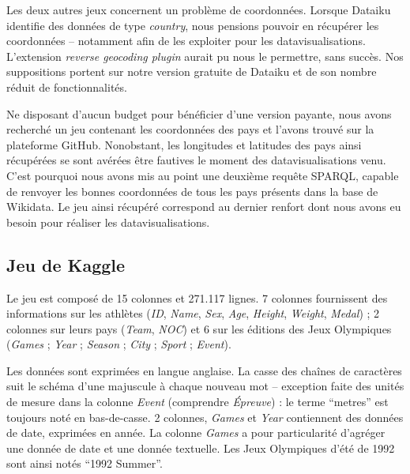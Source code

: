 \documentclass[hidelinks, 12pt]{report}
\begin{document}
Les deux autres jeux concernent un problème de coordonnées. Lorsque Dataiku identifie des données de type \textit{country}, nous pensions pouvoir en récupérer les coordonnées -- notamment afin de les exploiter pour les datavisualisations. L'extension \textit{reverse geocoding plugin} aurait pu nous le permettre, sans succès. Nos suppositions portent sur notre version gratuite de Dataiku et de son nombre réduit de fonctionnalités.

Ne disposant d'aucun budget pour bénéficier d'une version payante, nous avons recherché un jeu contenant les coordonnées des pays et l'avons trouvé sur la plateforme GitHub\autocite{github}. Nonobstant, les longitudes et latitudes des pays ainsi récupérées se sont avérées être fautives le moment des datavisualisations venu. C'est pourquoi nous avons mis au point une deuxième requête SPARQL, capable de renvoyer les bonnes coordonnées de tous les pays présents dans la base de Wikidata\autocite{wikiquerycoor}. Le jeu ainsi récupéré correspond au dernier renfort dont nous avons eu besoin pour réaliser les datavisualisations.





%





\subsection{Jeu de Kaggle}\label{kaggle}

Le jeu est composé de 15 colonnes et 271.117 lignes. 7 colonnes fournissent des informations sur les athlètes (\textit{ID}, \textit{Name}, \textit{Sex}, \textit{Age}, \textit{Height}, \textit{Weight}, \textit{Medal}) ; 2 colonnes sur leurs pays (\textit{Team}, \textit{NOC}) et 6 sur les éditions des Jeux Olympiques (\textit{Games} ; \textit{Year} ; \textit{Season} ; \textit{City} ; \textit{Sport} ; \textit{Event}).

Les données sont exprimées en langue anglaise. La casse des chaînes de caractères suit le schéma d'une majuscule à chaque nouveau mot -- exception faite des unités de mesure dans la colonne \textit{Event} (comprendre \textit{Épreuve}) : le terme \enquote{metres} est toujours noté en bas-de-casse. 2 colonnes, \textit{Games} et \textit{Year} contiennent des données de date, exprimées en année. La colonne \textit{Games} a pour particularité d'agréger une donnée de date et une donnée textuelle. Les Jeux Olympiques d'été de 1992 sont ainsi notés \enquote{1992 Summer}.
\end{document}

